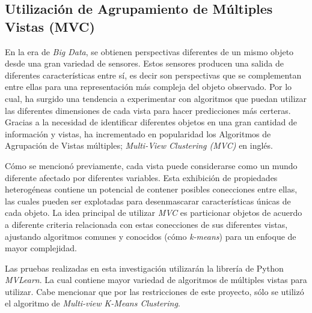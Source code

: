 \documentclass[letterpaper, 10 pt, conference]{ieeeconf}  %
\begin{document}
    \subsection{Utilización de Agrupamiento de Múltiples Vistas (MVC)}
    En la era de \textit{Big Data}, se obtienen perspectivas diferentes de un mismo objeto desde
    una gran variedad de sensores. Estos sensores producen una salida de diferentes características
    entre sí, es decir son perspectivas que se complementan entre ellas para una representación
    más compleja del objeto observado. Por lo cual, ha surgido una tendencia a experimentar con
    algoritmos que puedan utilizar las diferentes dimensiones de cada vista para hacer predicciones
    más certeras.  Gracias a la necesidad de identificar diferentes objetos en una gran cantidad de
    información y vistas, ha incrementado en popularidad los Algoritmos de Agrupación de Vistas
    múltiples; \textit{Multi-View Clustering (MVC)} en inglés.

    Cómo se mencionó previamente, cada vista puede considerarse como un mundo diferente afectado
    por diferentes variables. Esta exhibición de propiedades heterogéneas contiene un potencial de
    contener posibles conecciones entre ellas, las cuales pueden ser explotadas para desenmascarar
    características únicas de cada objeto. La idea principal de utilizar \textit{MVC} es
    particionar objetos de acuerdo a diferente criteria relacionada con estas conecciones de sus
    diferentes vistas, ajustando algoritmos comunes y conocidos (cómo \textit{k-means}) para un
    enfoque de mayor complejidad. \cite{Yang2018}

    Las pruebas realizadas en esta investigación utilizarán la librería de Python \textit{MVLearn}.
    \cite{MVlearn} La cual contiene mayor variedad de algoritmos de múltiples vistas para utilizar.
    Cabe mencionar que por las restricciones de este proyecto, sólo se utilizó el algoritmo de
    \textit{Multi-view K-Means Clustering}.

\end{document}
